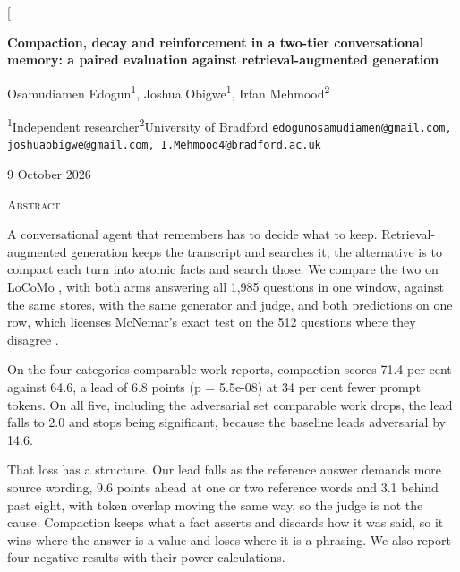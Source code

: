 \documentclass[10pt,a4paper,twocolumn]{article}
\begin{document}
\twocolumn[{%
\begin{center}
{\LARGE\bfseries Compaction, decay and reinforcement in a two-tier conversational memory: a paired evaluation against retrieval-augmented generation\par}
\vspace{0.9em}
{\large Osamudiamen Edogun\textsuperscript{1}, Joshua Obigwe\textsuperscript{1}, Irfan Mehmood\textsuperscript{2}\par}
\vspace{0.2em}
{\normalsize \textsuperscript{1}Independent researcher\quad \textsuperscript{2}University of Bradford \quad \texttt{edogunosamudiamen@gmail.com, joshuaobigwe@gmail.com, I.Mehmood4@bradford.ac.uk}\par}
\vspace{0.2em}
{\normalsize 9 October 2026\par}
\end{center}
\vspace{0.6em}
\begin{center}
\begin{minipage}{0.86\textwidth}
\small
{\centering\textsc{Abstract}\par}
\vspace{0.3em}
A conversational agent that remembers has to decide what to keep. Retrieval-augmented generation keeps the transcript and searches it; the alternative is to compact each turn into atomic facts and search those. We compare the two on LoCoMo \citep{maharana2024}, with both arms answering all 1,985 questions in one window, against the same stores, with the same generator and judge, and both predictions on one row, which licenses McNemar's exact test on the 512 questions where they disagree \citep{mcnemar1947,dietterich1998}.

On the four categories comparable work reports, compaction scores 71.4 per cent against 64.6, a lead of 6.8 points (p = 5.5e-08) at 34 per cent fewer prompt tokens. On all five, including the adversarial set comparable work drops, the lead falls to 2.0 and stops being significant, because the baseline leads adversarial by 14.6.

That loss has a structure. Our lead falls as the reference answer demands more source wording, 9.6 points ahead at one or two reference words and 3.1 behind past eight, with token overlap moving the same way, so the judge is not the cause. Compaction keeps what a fact asserts and discards how it was said, so it wins where the answer is a value and loses where it is a phrasing. We also report four negative results with their power calculations.


\end{minipage}
\end{center}}
\end{document}
